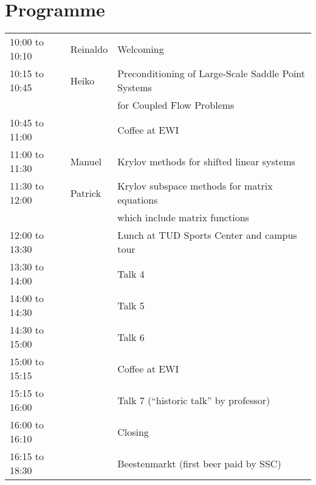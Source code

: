 \documentclass{article}
\begin{document}
\section{Programme}
\begin{table}[h]
\begin{tabular}{|l|l|l|}
\hline
10:00 to 10:10 & Reinaldo & Welcoming \\
10:15 to 10:45 & Heiko & Preconditioning of Large-Scale Saddle Point Systems \\ 
 & & for Coupled Flow Problems\\
10:45 to 11:00 & & Coffee at EWI\\ 
11:00 to 11:30 & Manuel & Krylov methods for shifted linear systems\\
11:30 to 12:00 & Patrick &  Krylov subspace methods for matrix equations\\
 & & which include matrix functions\\
12:00 to 13:30 & &  Lunch at TUD Sports Center and campus tour\\
13:30 to 14:00 & & Talk 4\\
14:00 to 14:30 & & Talk 5\\
14:30 to 15:00 & & Talk 6\\
15:00 to 15:15 & &  Coffee at EWI \\
15:15 to 16:00 & & Talk 7 (``historic talk'' by professor)\\
16:00 to 16:10 & &  Closing\\
16:15 to 18:30 & & Beestenmarkt (first beer paid by SSC) \\
\hline
\end{tabular}
\end{table}
\end{document}
